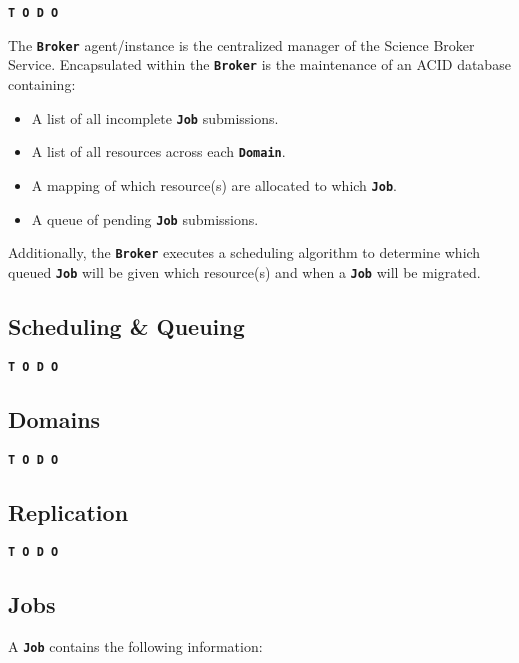 \documentclass{ReportCUNY}
\newcommand{\KeyWord}[1]{\textbf{\texttt{#1}}}
\begin{document}
\begin{center}\textbf{\texttt{T~O~D~O}}\end{center}

The \KeyWord{Broker} agent/instance is the centralized manager of the Science Broker Service.
Encapsulated within the \KeyWord{Broker} is the maintenance of an ACID database containing:
\begin{itemize}
\item A list of all incomplete \KeyWord{Job} submissions.
\item A list of all resources across each \KeyWord{Domain}.
\item A mapping of which resource(s) are allocated to which \KeyWord{Job}.
\item A queue of pending \KeyWord{Job} submissions.
\end{itemize}

Additionally, the \KeyWord{Broker} executes a scheduling algorithm to determine which queued \KeyWord{Job} will be given which resource(s) and when a \KeyWord{Job} will be migrated.


\subsection{Scheduling \& Queuing}

\begin{center}\textbf{\texttt{T~O~D~O}}\end{center}


\subsection{Domains}

\begin{center}\textbf{\texttt{T~O~D~O}}\end{center}


\subsection{Replication}

\begin{center}\textbf{\texttt{T~O~D~O}}\end{center}


\subsection{Jobs}

A \KeyWord{Job} contains the following information:
\end{document}
